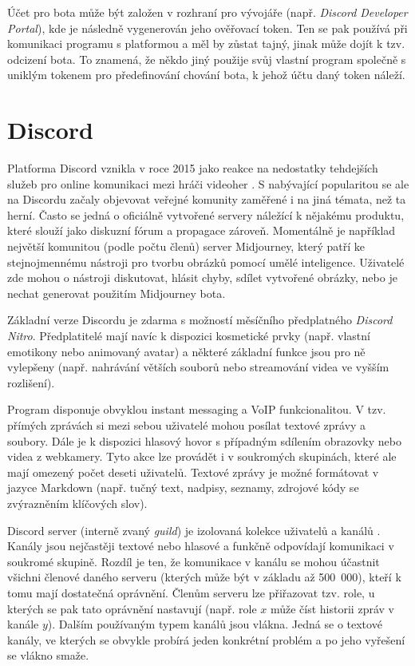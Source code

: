 \documentclass[FM]{tulthesis}
\begin{document}
	Účet pro bota může být založen v rozhraní pro vývojáře (např. \textit{Discord Developer Portal}), kde je následně vygenerován jeho ověřovací token. Ten se pak používá při komunikaci programu s platformou a měl by zůstat tajný, jinak může dojít k tzv. odcizení bota. To znamená, že někdo jiný použije svůj vlastní program společně s uniklým tokenem pro předefinování chování bota, k jehož účtu daný token náleží.
	
	\section{Discord}
	
	Platforma Discord vznikla v roce 2015 jako reakce na nedostatky tehdejších služeb pro online komunikaci mezi hráči videoher \cite{lit_Discord}. S nabývající popularitou se ale na Discordu začaly objevovat veřejné komunity zaměřené i na jiná témata, než ta herní. Často se jedná o oficiálně vytvořené servery náležící k nějakému produktu, které slouží jako diskuzní fórum a propagace zároveň. Momentálně je například největší komunitou (podle počtu členů) server Midjourney, který patří ke stejnojmennému nástroji pro tvorbu obrázků pomocí umělé inteligence. Uživatelé zde mohou o nástroji diskutovat, hlásit chyby, sdílet vytvořené obrázky, nebo je nechat generovat použitím Midjourney bota.
	
	Základní verze Discordu je zdarma s možností měsíčního předplatného \textit{Discord Nitro}. Předplatitelé mají navíc k dispozici kosmetické prvky (např. vlastní emotikony nebo animovaný avatar) a některé základní funkce jsou pro ně vylepšeny (např. nahrávání větších souborů nebo streamování videa ve vyšším rozlišení).	

	Program disponuje obvyklou instant messaging a VoIP funkcionalitou. V tzv. přímých zprávách si mezi sebou uživatelé mohou posílat textové zprávy a soubory. Dále je k dispozici hlasový hovor s případným sdílením obrazovky nebo videa z webkamery. Tyto akce lze provádět i v soukromých skupinách, které ale mají omezený počet deseti uživatelů. Textové zprávy je možné formátovat v jazyce Markdown (např. tučný text, nadpisy, seznamy, zdrojové kódy se zvýrazněním klíčových slov).
	
	Discord server (interně zvaný \textit{guild}) je izolovaná kolekce uživatelů a kanálů \cite{doc_Discord}. Kanály jsou nejčastěji textové nebo hlasové a funkčně odpovídají komunikaci v soukromé skupině. Rozdíl je ten, že komunikace v kanálu se mohou účastnit všichni členové daného serveru (kterých může být v základu až 500~000), kteří k tomu mají dostatečná oprávnění. Členům serveru lze přiřazovat tzv. role, u kterých se pak tato oprávnění nastavují (např. role $x$ může číst historii zpráv v kanále $y$). Dalším používaným typem kanálů jsou vlákna. Jedná se o textové kanály, ve kterých se obvykle probírá jeden konkrétní problém a po jeho vyřešení se vlákno smaže.
	
\end{document}
